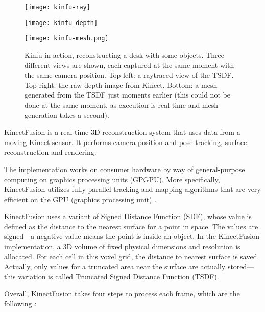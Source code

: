 \begin{figure}
    \centering
    \begin{minipage}{0.49\textwidth}
        \texttt{[image: kinfu-ray]}
    \end{minipage}
    \begin{minipage}{0.49\textwidth}
        \texttt{[image: kinfu-depth]}
    \end{minipage}
    \texttt{[image: kinfu-mesh.png]}
    \caption{Kinfu in action, reconstructing a desk with some objects. Three different views are shown, each captured at the same moment with the same camera position. Top left: a raytraced view of the TSDF. Top right: the raw depth image from Kinect. Bottom: a mesh generated from the TSDF just moments earlier (this could not be done at the same moment, as execution is real-time and mesh generation takes a second).}
    \label{fig:kinfu-mesh}
\end{figure}

KinectFusion is a real-time 3D reconstruction system that uses data from a moving Kinect sensor. It performs camera position and pose tracking, surface reconstruction and rendering. \citep{izadi2011kinectfusion}

The implementation works on consumer hardware by way of general-purpose computing on graphics processing units (GPGPU). More specifically, KinectFusion utilizes fully parallel tracking and mapping algorithms that are very efficient on the GPU (graphics processing unit) \citep{newcombe2011kinectfusion}.

KinectFusion uses a variant of Signed Distance Function (SDF), whose value is defined as the distance to the nearest surface for a point in space. The values are signed---a negative value means the point is inside an object. In the KinectFusion implementation, a 3D volume of fixed physical dimensions and resolution is allocated. For each cell in this voxel grid, the distance to nearest surface is saved. Actually, only values for a truncated area near the surface are actually stored---this variation is called Truncated Signed Distance Function (TSDF). \citep{izadi2011kinectfusion}

Overall, KinectFusion takes four steps to process each frame, which are the following \autocites{newcombe2011kinectfusion}{izadi2011kinectfusion}:

